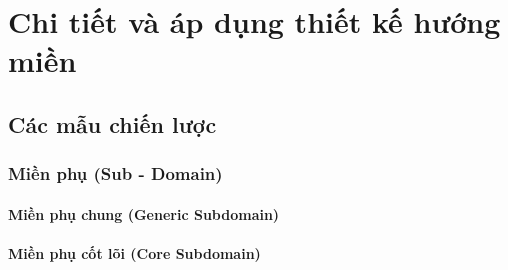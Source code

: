 \documentclass{report} %
\begin{document}

% 


% 

% 


% 


\chapter{Chi tiết và áp dụng thiết kế hướng miền}



\section{Các mẫu chiến lược}



\newpage

\subsection{Miền phụ (Sub - Domain)}



\subsubsection{Miền phụ chung (Generic Subdomain)}



\subsubsection{Miền phụ cốt lõi (Core Subdomain)}
\end{document}
